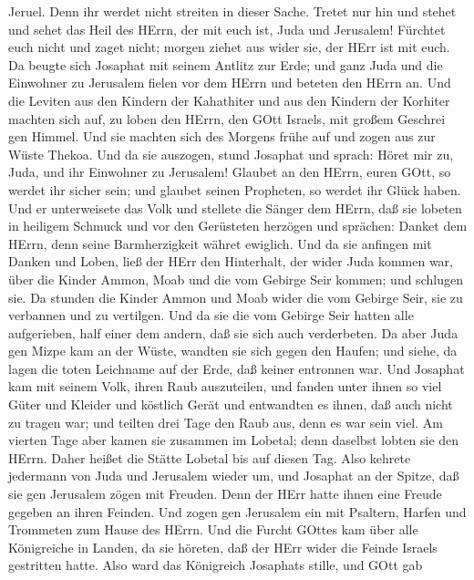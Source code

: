 Jeruel.  Denn ihr werdet nicht streiten in dieser Sache.
Tretet nur hin und stehet und sehet das Heil des HErrn, der mit euch
ist, Juda und Jerusalem! Fürchtet euch nicht und zaget nicht; morgen
ziehet aus wider sie, der HErr ist mit euch.  Da beugte
sich Josaphat mit seinem Antlitz zur Erde; und ganz Juda und die
Einwohner zu Jerusalem fielen vor dem HErrn und beteten den HErrn an.
 Und die Leviten aus den Kindern der Kahathiter und aus den
Kindern der Korhiter machten sich auf, zu loben den HErrn, den GOtt
Israels, mit großem Geschrei gen Himmel.  Und sie machten
sich des Morgens frühe auf und zogen aus zur Wüste Thekoa. Und da sie
auszogen, stund Josaphat und sprach: Höret mir zu, Juda, und ihr
Einwohner zu Jerusalem! Glaubet an den HErrn, euren GOtt, so werdet ihr
sicher sein; und glaubet seinen Propheten, so werdet ihr Glück haben.
 Und er unterweisete das Volk und stellete die Sänger dem
HErrn, daß sie lobeten in heiligem Schmuck und vor den Gerüsteten
herzögen und sprächen: Danket dem HErrn, denn seine Barmherzigkeit
währet ewiglich.  Und da sie anfingen mit Danken und Loben,
ließ der HErr den Hinterhalt, der wider Juda kommen war, über die Kinder
Ammon, Moab und die vom Gebirge Seir kommen; und schlugen sie.
 Da stunden die Kinder Ammon und Moab wider die vom Gebirge
Seir, sie zu verbannen und zu vertilgen. Und da sie die vom Gebirge Seir
hatten alle aufgerieben, half einer dem andern, daß sie sich auch
verderbeten.  Da aber Juda gen Mizpe kam an der Wüste,
wandten sie sich gegen den Haufen; und siehe, da lagen die toten
Leichname auf der Erde, daß keiner entronnen war.  Und
Josaphat kam mit seinem Volk, ihren Raub auszuteilen, und fanden unter
ihnen so viel Güter und Kleider und köstlich Gerät und entwandten es
ihnen, daß auch nicht zu tragen war; und teilten drei Tage den Raub aus,
denn es war sein viel.  Am vierten Tage aber kamen sie
zusammen im Lobetal; denn daselbst lobten sie den HErrn. Daher heißet
die Stätte Lobetal bis auf diesen Tag.  Also kehrete
jedermann von Juda und Jerusalem wieder um, und Josaphat an der Spitze,
daß sie gen Jerusalem zögen mit Freuden. Denn der HErr hatte ihnen eine
Freude gegeben an ihren Feinden.  Und zogen gen Jerusalem
ein mit Psaltern, Harfen und Trommeten zum Hause des HErrn.
 Und die Furcht GOttes kam über alle Königreiche in Landen,
da sie höreten, daß der HErr wider die Feinde Israels gestritten hatte.
 Also ward das Königreich Josaphats stille, und GOtt gab
